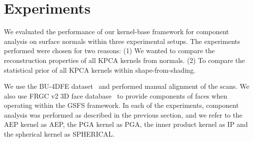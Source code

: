 \section{Experiments}\label{sec:experiments}
We evaluated the performance of our kernel-base framework for component analysis
on surface normals within three experimental setups. The experiments performed
were chosen for two reasons: (1) We wanted to compare the reconstruction
properties of all KPCA kernels from normals. (2) To compare the statistical
prior of all KPCA kernels within shape-from-shading.

We use the BU-4DFE dataset~\cite{yin2008high} and performed manual alignment
of the scans. We also use FRGC v2 3D face database~\cite{phillips2005overview} to
provide components of faces when operating within the GSFS framework. In each
of the experiments, component analysis was performed as described in the
previous section, and we refer to the AEP kernel as AEP, the PGA kernel as
PGA, the inner product kernel as IP and the spherical kernel as SPHERICAL\@.
